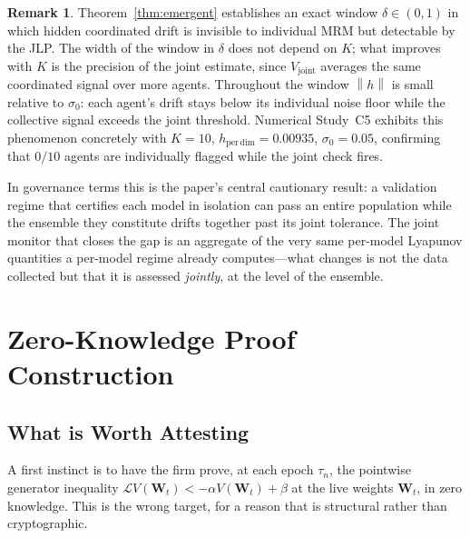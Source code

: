 \documentclass[12pt]{article}
\theoremstyle{plain}
\theoremstyle{definition}
\newtheorem{remark}[theorem]{Remark}
\newcommand{\Lgen}{\mathcal{L}}
\newcommand{\W}{\mathbf{W}}
\newcommand{\norm}[1]{\left\lVert #1 \right\rVert}
\begin{document}
\begin{remark}
  Theorem~\ref{thm:emergent} establishes an exact window $\delta \in
  (0, 1)$ in which hidden coordinated drift is invisible
  to individual MRM but detectable by the JLP.  The width of the window in
  $\delta$ does not depend on $K$; what improves with $K$ is the precision of
  the joint estimate, since $V_{\mathrm{joint}}$ averages the same coordinated
  signal over more agents.  Throughout the window $\norm{h}$ is small relative
  to $\sigma_0$: each agent's drift stays below its individual noise floor
  while the collective signal exceeds the joint threshold.  Numerical Study~C5 exhibits this phenomenon
  concretely with $K=10$, $h_{\mathrm{per\,dim}} = 0.00935$,
  $\sigma_0 = 0.05$, confirming that $0/10$ agents are individually
  flagged while the joint check fires.

In governance terms this is the paper's central cautionary result: a validation regime that certifies each model in isolation can pass an entire population while the ensemble they constitute drifts together past its joint tolerance. The joint monitor that closes the gap is an aggregate of the very same per-model Lyapunov quantities a per-model regime already computes---what changes is not the data collected but that it is assessed \emph{jointly}, at the level of the ensemble.
\end{remark}

\section{Zero-Knowledge Proof Construction}
\label{sec:zk}

\subsection{What is Worth Attesting}

A first instinct is to have the firm prove, at each epoch $\tau_n$, the
pointwise generator inequality $\Lgen V(\W_t) < -\alpha V(\W_t)+\beta$ at
the live weights $\W_t$, in zero knowledge.  This is the wrong target, for
a reason that is structural rather than cryptographic.
\end{document}
